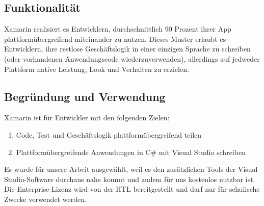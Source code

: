 \subsection*{Funktionalität}
Xamarin realisiert es Entwicklern, durchschnittlich 90 Prozent ihrer App 
plattformübergreifend miteinander zu nutzen. Dieses Muster erlaubt es 
Entwicklern, ihre restlose Geschäftslogik in einer einzigen Sprache 
zu schreiben (oder vorhandenen Anwendungscode wiederzuverwenden), 
allerdings auf jedweder Plattform native Leistung, Look und Verhalten 
zu erzielen.
\subsection*{Begründung und Verwendung}
Xamarin ist für Entwickler mit den folgenden Zielen:
\begin{enumerate}
    \item Code, Test und Geschäftslogik plattformübergreifend teilen
    \item Plattformübergreifende Anwendungen in C\# mit Visual Studio schreiben
\end{enumerate}
Es wurde für unsere Arbeit ausgewählt, weil es den zusätzlichen Tools 
der Visual Studio-Software durchaus nahe kommt und zudem für uns kostenlos 
nutzbar ist. Die Enterprise-Lizenz wird von der HTL bereitgestellt und 
darf nur für schulische Zwecke verwendet werden.